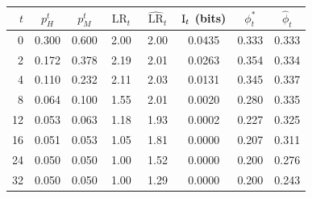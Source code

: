 \begin{tabular}{@{}rccccccc@{}}
\toprule
$t$ & $p_H^t$ & $p_M^t$ & $\operatorname{LR}_t$ & $\widehat{\operatorname{LR}}_t$ & $\mathrm{I}_t$ (bits) & $\phi_t^\ast$ & $\hat\phi_t$ \\
\midrule
0 & 0.300 & 0.600 & 2.00 & 2.00 & 0.0435 & 0.333 & 0.333 \\
2 & 0.172 & 0.378 & 2.19 & 2.01 & 0.0263 & 0.354 & 0.334 \\
4 & 0.110 & 0.232 & 2.11 & 2.03 & 0.0131 & 0.345 & 0.337 \\
8 & 0.064 & 0.100 & 1.55 & 2.01 & 0.0020 & 0.280 & 0.335 \\
12 & 0.053 & 0.063 & 1.18 & 1.93 & 0.0002 & 0.227 & 0.325 \\
16 & 0.051 & 0.053 & 1.05 & 1.81 & 0.0000 & 0.207 & 0.311 \\
24 & 0.050 & 0.050 & 1.00 & 1.52 & 0.0000 & 0.200 & 0.276 \\
32 & 0.050 & 0.050 & 1.00 & 1.29 & 0.0000 & 0.200 & 0.243 \\
\bottomrule
\end{tabular}
